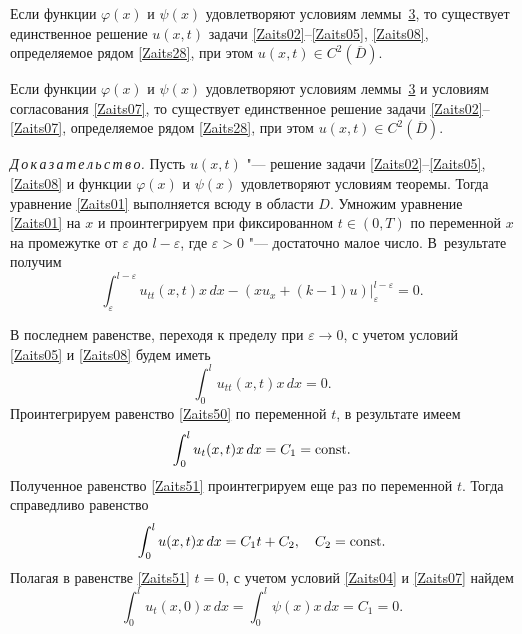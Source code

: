 \smallskip

\begin{theorem}[2]Если функции $\varphi(x)$ и $\psi(x)$ удовлетворяют условиям леммы~{\rm \hyperlink{zay:l3}{3},} то существует единственное решение $u(x, t)$ задачи {\rm \eqref{Zaits02}--\eqref{Zaits05}, \eqref{Zaits08},} определяемое рядом {\rm \eqref{Zaits28},} при этом $u(x,t)\in C^2(\overline{D}).$
\end{theorem}

\smallskip

\begin{theorem}[3]
Если функции $\varphi(x)$ и $\psi(x)$ удовлетворяют условиям леммы~{\rm \hyperlink{zay:l3}{3}} и условиям согласования {\rm \eqref{Zaits07},} то существует единственное решение задачи {\rm  \eqref{Zaits02}--\eqref{Zaits07},} определяемое рядом {\rm \eqref{Zaits28},} при этом $u(x,t)\in C^2(\overline{D}).$
\end{theorem}

\smallskip

\textit{Д\,о\,к\,а\,з\,а\,т\,е\,л\,ь\,с\,т\,в\,о.} 
Пусть $u(x,t)$ "--- решение задачи \eqref{Zaits02}--\eqref{Zaits05}, \eqref{Zaits08} и функции $\varphi(x)$ и $\psi(x)$ удовлетворяют условиям теоремы. 
Тогда уравнение \eqref{Zaits01} выполняется всюду в области $D$. 
Умножим уравнение \eqref{Zaits01} на $x$ и проинтегрируем при фиксированном $t\in(0, T)$ по переменной $x$ на промежутке от $\varepsilon$ до $l-\varepsilon$, где $\varepsilon>0$ "--- достаточно малое число. 
В~результате получим
$$ \int _\varepsilon^{l-\varepsilon}u_{tt}(x,t)x\,dx-\left(xu_x+(k-1)u\right)\Bigr|_\varepsilon^{l-\varepsilon}=0.$$

В последнем равенстве, переходя к пределу при $\varepsilon\rightarrow0$, с учетом условий \eqref{Zaits05} и \eqref{Zaits08} будем иметь
\begin{equation}
\label{Zaits50}
 \int _0^lu_{tt}(x,t)x\,dx=0.
\end{equation}
Проинтегрируем равенство \eqref{Zaits50} по переменной $t$, в результате имеем
\begin{equation}
\label{Zaits51}
 \int _0^lu_t(x,t)x\,dx=C_1={\rm const}.
\end{equation}
Полученное равенство \eqref{Zaits51} проинтегрируем еще раз по переменной $t$. Тогда справедливо равенство
\begin{equation}
\label{Zaits52}
 \int _0^lu(x,t)x\,dx=C_1t+C_2,\quad C_2={\rm const}.
\end{equation}
Полагая в равенстве \eqref{Zaits51} $t=0$, с учетом условий \eqref{Zaits04} и \eqref{Zaits07} найдем
$$ \int _0^lu_t(x,0)x\,dx= \int _0^l\psi(x)x\,dx=C_1=0.$$

